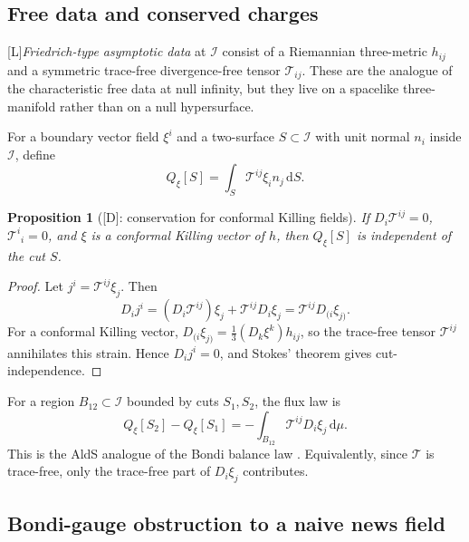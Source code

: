 \documentclass[11pt,a4paper]{article}
\newtheorem{proposition}[theorem]{Proposition}
\newcommand{\scri}{\mathscr{I}}
\newcommand{\cT}{\mathcal{T}}
\newcommand{\diff}{\mathrm{d}}
\newcommand{\statusL}{\textsf{[L]}}
\newcommand{\statusD}{\textsf{[D]}}
\begin{document}
\subsection{Free data and conserved charges}

\statusL \textsl{Friedrich-type asymptotic data} at \(\scri\) consist of a Riemannian three-metric \(h_{ij}\) and a symmetric trace-free divergence-free tensor \(\cT_{ij}\).  These are the analogue of the characteristic free data at null infinity, but they live on a spacelike three-manifold rather than on a null hypersurface.

For a boundary vector field \(\xi^i\) and a two-surface \(S\subset\scri\) with unit normal \(n_i\) inside \(\scri\), define
\begin{equation}
  Q_\xi[S]
  =
  \int_S \cT^{ij}\xi_i n_j\,\diff S .
\end{equation}

\begin{proposition}[\statusD: conservation for conformal Killing fields]
If \(D_i\cT^{ij}=0\), \(\cT^i{}_i=0\), and \(\xi\) is a conformal Killing vector of \(h\), then \(Q_\xi[S]\) is independent of the cut \(S\).
\end{proposition}
\begin{proof}
Let \(j^i=\cT^{ij}\xi_j\).  Then
\begin{equation}
  D_i j^i
  =
  (D_i\cT^{ij})\xi_j+\cT^{ij}D_i\xi_j
  =
  \cT^{ij}D_{(i}\xi_{j)} .
\end{equation}
For a conformal Killing vector, \(D_{(i}\xi_{j)}=\frac13(D_k\xi^k)h_{ij}\), so the trace-free tensor \(\cT^{ij}\) annihilates this strain.  Hence \(D_i j^i=0\), and Stokes' theorem gives cut-independence.
\end{proof}

For a region \(B_{12}\subset\scri\) bounded by cuts \(S_1,S_2\), the flux law is
\begin{equation}\label{eq:aldS-flux}
  Q_\xi[S_2]-Q_\xi[S_1]
  =
  -\int_{B_{12}} \cT^{ij}D_i\xi_j\,\diff\mu .
\end{equation}
This is the AldS analogue of the Bondi balance law \cite{poole2025charges}.  Equivalently, since \(\cT\) is trace-free, only the trace-free part of \(D_i\xi_j\) contributes.

\subsection{Bondi-gauge obstruction to a naive news field}
\end{document}

